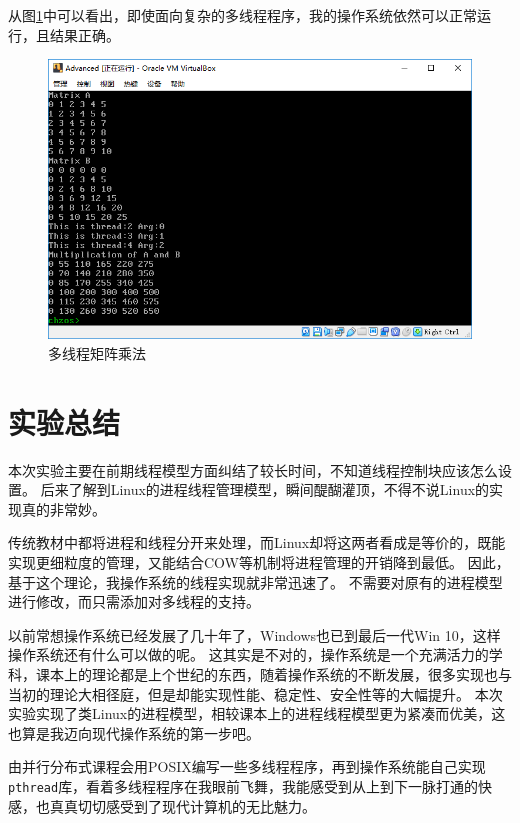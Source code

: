 \documentclass[logo,reportComp]{thesis}
\begin{document}
从图\ref{fig:matmul}中可以看出，即使面向复杂的多线程程序，我的操作系统依然可以正常运行，且结果正确。
\begin{figure}[H]
\centering
\includegraphics[width=0.8\linewidth]{fig/matmul.PNG}
\caption{多线程矩阵乘法}
\label{fig:matmul}
\end{figure}

\section{实验总结}
本次实验主要在前期线程模型方面纠结了较长时间，不知道线程控制块应该怎么设置。
后来了解到Linux的进程线程管理模型，瞬间醍醐灌顶，不得不说Linux的实现真的非常妙。

传统教材中都将进程和线程分开来处理，而Linux却将这两者看成是等价的，既能实现更细粒度的管理，又能结合COW等机制将进程管理的开销降到最低。
因此，基于这个理论，我操作系统的线程实现就非常迅速了。
不需要对原有的进程模型进行修改，而只需添加对多线程的支持。

以前常想操作系统已经发展了几十年了，Windows也已到最后一代Win 10，这样操作系统还有什么可以做的呢。
这其实是不对的，操作系统是一个充满活力的学科，课本上的理论都是上个世纪的东西，随着操作系统的不断发展，很多实现也与当初的理论大相径庭，但是却能实现性能、稳定性、安全性等的大幅提升。
本次实验实现了类Linux的进程模型，相较课本上的进程线程模型更为紧凑而优美，这也算是我迈向现代操作系统的第一步吧。

由并行分布式课程会用POSIX编写一些多线程程序，再到操作系统能自己实现\verb'pthread'库，看着多线程程序在我眼前飞舞，我能感受到从上到下一脉打通的快感，也真真切切感受到了现代计算机的无比魅力。
\end{document}
